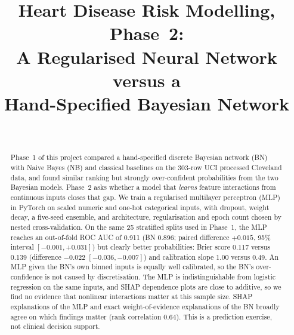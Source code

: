 \documentclass[conference]{IEEEtran}
\begin{document}
\title{Heart Disease Risk Modelling, Phase~2:\\A Regularised Neural Network versus a\\Hand-Specified Bayesian Network}

\author{
\and
{}
\and
{}
\and
{}
\and
{}
\\[1ex]
}

\maketitle

\begin{abstract}
Phase~1 of this project compared a hand-specified discrete Bayesian network (BN) with Naive Bayes (NB) and classical baselines on the 303-row UCI processed Cleveland data, and found similar ranking but strongly over-confident probabilities from the two Bayesian models. Phase~2 asks whether a model that \emph{learns} feature interactions from continuous inputs closes that gap. We train a regularised multilayer perceptron (MLP) in PyTorch on scaled numeric and one-hot categorical inputs, with dropout, weight decay, a five-seed ensemble, and architecture, regularisation and epoch count chosen by nested cross-validation. On the same 25 stratified splits used in Phase~1, the MLP reaches an out-of-fold ROC AUC of 0.911 (BN 0.896; paired difference $+0.015$, 95\% interval $[-0.001, +0.031]$) but clearly better probabilities: Brier score 0.117 versus 0.139 (difference $-0.022$ $[-0.036, -0.007]$) and calibration slope 1.00 versus 0.49. An MLP given the BN's own binned inputs is equally well calibrated, so the BN's over-confidence is not caused by discretisation. The MLP is indistinguishable from logistic regression on the same inputs, and SHAP dependence plots are close to additive, so we find no evidence that nonlinear interactions matter at this sample size. SHAP explanations of the MLP and exact weight-of-evidence explanations of the BN broadly agree on which findings matter (rank correlation 0.64). This is a prediction exercise, not clinical decision support.
\end{abstract}
\end{document}
